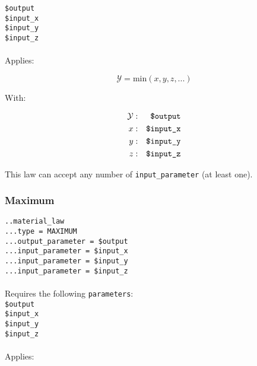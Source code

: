 \documentclass[10pt]{article}
\begin{document}
\noindent \verb+$output+\\
\verb+$input_x+\\
\verb+$input_y+\\
\verb+$input_z+

\paragraph{}Applies:

\begin{equation}
	\mathcal{Y} = \mathrm{min}( x,y,z,... )
\end{equation}

With:

\begin{eqnarray}
	\mathcal{Y} & : & \verb+$output+ \notag \\
	x & : & \verb+$input_x+ \notag \\
	y & : & \verb+$input_y+ \notag \\
	z & : & \verb+$input_z+ \notag 
\end{eqnarray}

This law can accept any number of \verb+input_parameter+ (at least one).

\subsubsection{Maximum}

\noindent \verb+..material_law+\\
\verb+...type = MAXIMUM+\\
\verb+...output_parameter = $output+\\
\verb+...input_parameter = $input_x+\\
\verb+...input_parameter = $input_y+\\
\verb+...input_parameter = $input_z+

\paragraph{}Requires the following \verb+parameters+:\\

\noindent \verb+$output+\\
\verb+$input_x+\\
\verb+$input_y+\\
\verb+$input_z+

\paragraph{}Applies:
\end{document}

